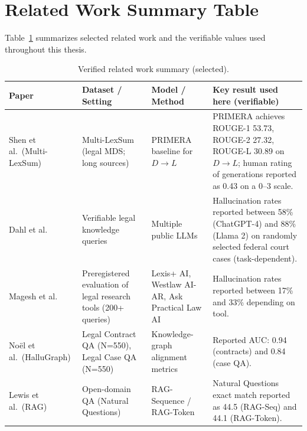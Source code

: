 \label{ch:lit-review}








\section{Related Work Summary Table}
Table~\ref{tab:relatedwork} summarizes selected related work and the verifiable values used throughout this thesis.

\begin{table}[!t]
\centering
\caption{Verified related work summary (selected).}
\label{tab:relatedwork}
\begin{tabular}{@{}p{3.4cm}p{3.0cm}p{3.0cm}p{4.6cm}@{}}
\toprule
\textbf{Paper} & \textbf{Dataset / Setting} & \textbf{Model / Method} & \textbf{Key result used here (verifiable)} \\
\midrule
Shen et al.\ (Multi-LexSum) \cite{shen2022multilexsum} & Multi-LexSum (legal MDS; long sources) & PRIMERA baseline for \(D \rightarrow L\) & PRIMERA achieves ROUGE-1 53.73, ROUGE-2 27.32, ROUGE-L 30.89 on \(D \rightarrow L\); human rating of generations reported as 0.43 on a 0--3 scale. \\
\addlinespace
Dahl et al.\ \cite{dahl2024largelegalfictions} & Verifiable legal knowledge queries & Multiple public LLMs & Hallucination rates reported between 58\% (ChatGPT-4) and 88\% (Llama 2) on randomly selected federal court cases (task-dependent). \\
\addlinespace
Magesh et al.\ \cite{magesh2025hallucinationfree} & Preregistered evaluation of legal research tools (200+ queries) & Lexis+ AI, Westlaw AI-AR, Ask Practical Law AI & Hallucination rates reported between 17\% and 33\% depending on tool. \\
\addlinespace
No{\"e}l et al.\ (HalluGraph) \cite{noel2025hallugraph} & Legal Contract QA (N=550), Legal Case QA (N=550) & Knowledge-graph alignment metrics & Reported AUC: 0.94 (contracts) and 0.84 (case QA). \\
\addlinespace
Lewis et al.\ (RAG) \cite{lewis2020rag} & Open-domain QA (Natural Questions) & RAG-Sequence / RAG-Token & Natural Questions exact match reported as 44.5 (RAG-Seq) and 44.1 (RAG-Token). \\
\bottomrule
\end{tabular}
\end{table}

